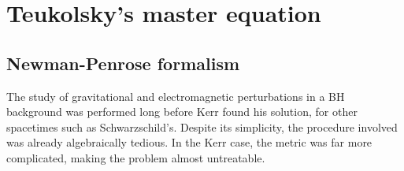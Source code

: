 
\chapter{Teukolsky's master equation} %
\label{Chapter3}

\section{Newman-Penrose formalism}

The study of gravitational and electromagnetic perturbations in a BH background was performed long before Kerr found his solution, for other spacetimes such as Schwarzschild's.
Despite its simplicity, the procedure involved was already algebraically tedious.
In the Kerr case, the metric was far more complicated, making the problem almost untreatable.

